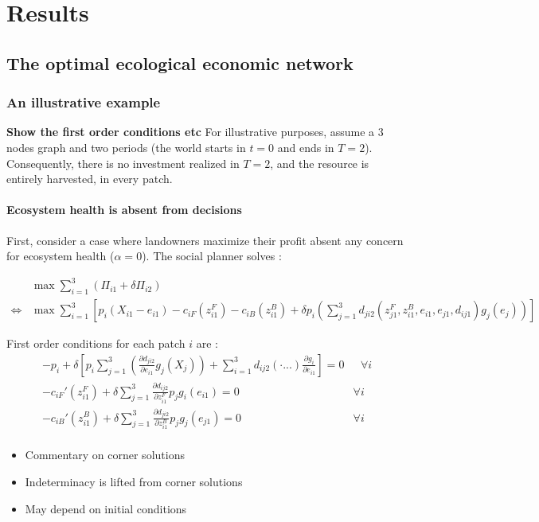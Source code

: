 \documentclass{article}
\begin{document}
\section{Results}
\subsection{The optimal ecological economic network}
\subsubsection{An illustrative example}
\textbf{Show the first order conditions etc}
For illustrative purposes, assume a 3 nodes graph and two periods (the world starts in $t=0$ and ends in $T=2$). Consequently, there is no investment realized in $T=2$, and the resource is entirely harvested, in every patch. 

\paragraph{Ecosystem health is absent from decisions}
First, consider a case where landowners maximize their profit absent any concern for ecosystem health ($\alpha = 0$). The social planner solves : 

\begin{align*}
& \max \sum_{i=1}^3 \left(\Pi_{i1} + \delta \Pi_{i2}\right)\\
\iff	 &\max  \sum_{i=1}^3 \left[ p_i (X_{i1}-e_{i1}) - c_{iF}(z_{i1}^F) - c_{iB}(z_{i1}^B) + \delta p_i \left( \sum_{j=1}^3 d_{ji2}(z_{j1}^F, z_{i1}^B, e_{i1},e_{j1}, d_{ij1})g_j(e_j)\right) \right]
\end{align*}

First order conditions for each patch $i$ are : 
\begin{align*}
-p_i + \delta \left[ p_i \sum_{j=1}^3 \left( \frac{\partial d_{ji2}}{\partial e_{i1}}g_j(X_j) \right) + \sum_{i=1}^3 d_{ij2}(\cdot...) \frac{\partial g_i}{\partial e_{i1}}\right] = 0 &\text{ } \forall i\\
- c_{iF}'(z_{i1}^F) + \delta \sum_{j=1}^3 \frac{\partial d_{ij2}}{\partial z_{i1}^F}p_j g_i(e_{i1}) =0  \text{ } &\forall i\\
- c_{iB}'(z_{i1}^B) + \delta  \sum_{j=1}^3 \frac{\partial d_{ji2}}{\partial z_{i1}^B}p_jg_j(e_{j1}) = 0 \text{ } &\forall i\\
\end{align*}
\begin{itemize}
\item Commentary on corner solutions
\item Indeterminacy is lifted from corner solutions
\item May depend on initial conditions
\end{itemize}
\end{document}
